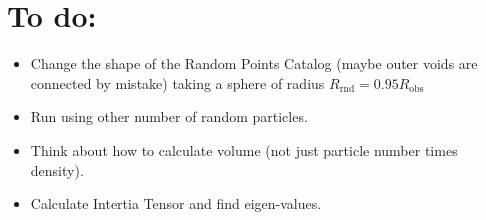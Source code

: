 \documentclass[preprint]{aastex62}
\begin{document}
\section{To do:}

\begin{itemize}
\item Change the shape of the Random Points Catalog (maybe outer voids are
  connected by mistake) taking a sphere of radius $R_{\mathrm{rnd}} = 0.95R_{\mathrm{obs}}$
\item Run using other number of random particles.
\item Think about how to calculate volume (not just particle number times density).
\item Calculate Intertia Tensor and find eigen-values.
\end{itemize} 







                       

\end{document}
